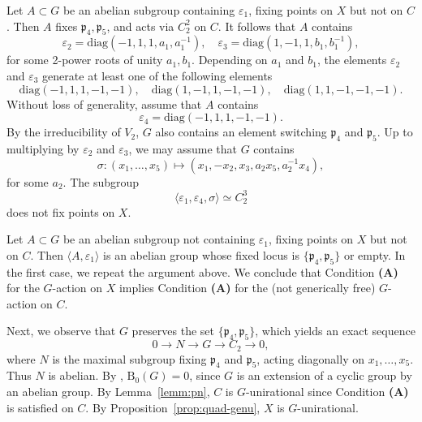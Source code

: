 \documentclass[12pt,reqno]{amsart}
\theoremstyle{plain}
\theoremstyle{remark}
\theoremstyle{definition}
\numberwithin{equation}{section}
\def\bP{{\mathbb P}}
\begin{document}
Let $A\subset G$ be an abelian subgroup containing $\varepsilon_1$, 
fixing points on $X$ but not on $C$. Then $A$ fixes $\mathfrak p_4, \mathfrak p_5$, and  acts via $C_2^2$ on $C$. It follows that $A$ contains 
$$
\varepsilon_2=\mathrm{diag}(-1,1,1,a_1,a_1^{-1}),\quad\varepsilon_3=\mathrm{diag}(1,-1,1,b_1,b_1^{-1}),
$$
for some 2-power roots of unity $a_1, b_1$. Depending on $a_1$ and $b_1$, the elements $\varepsilon_2$ and $\varepsilon_3$ generate at least one of the following elements
$$
\mathrm{diag}(-1,1,1,-1,-1),\quad \mathrm{diag}(1,-1,1,-1,-1),\quad \mathrm{diag}(1,1,-1,-1,-1).
$$
Without loss of generality, assume that $A$ contains 
$$
\varepsilon_4=\mathrm{diag}(-1,1,1,-1,-1).
$$
By the irreducibility of $V_2$,  $G$ also contains an element switching $\mathfrak p_4$ and $\mathfrak p_5$. Up to multiplying by $\varepsilon_2$ and $\varepsilon_3$, we may assume that $G$ contains 
$$
\sigma:(x_1,\ldots,x_5)\mapsto(x_1,-x_2, x_3,a_2x_5,a_2^{-1}x_4),
$$
for some $a_2$. The subgroup 
$$
\langle\varepsilon_1,\varepsilon_4,\sigma\rangle\simeq C_2^3
$$
does not fix points on $X$.

Let $A\subset G$ be an abelian subgroup not containing $\varepsilon_1$, fixing points on $X$ but not on $C$. Then $\langle A,\varepsilon_1\rangle$ is an abelian group whose fixed locus is $\{\mathfrak p_4,\mathfrak p_5\}$ or empty. In the first case, we repeat the argument above. We conclude that Condition {\bf (A)} for the $G$-action  on $X$ implies 
Condition {\bf (A)} for the (not generically free) $G$-action on $C$. 


Next, 
we observe that 
$G$ preserves the set $\{\mathfrak p_4,\mathfrak p_5\}$, which yields an exact sequence 
$$
0\to N\to G\to C_2\to 0,
$$
where $N$ is the maximal subgroup fixing $\mathfrak p_4$ and $\mathfrak p_5$, acting diagonally on $x_1,\ldots, x_5$. Thus $N$ is abelian. By \cite[Lemma 3.1]{KT-Brauer},  $\mathrm B_0(G)=0$, since $G$ is an extension of a cyclic group by an abelian group.  By Lemma~\ref{lemm:pn}, $C$ is $G$-unirational since Condition {\bf(A)} is satisfied on $C$. By Proposition~\ref{prop:quad-genu}, $X$ is $G$-unirational.

 \ 
\end{document}
